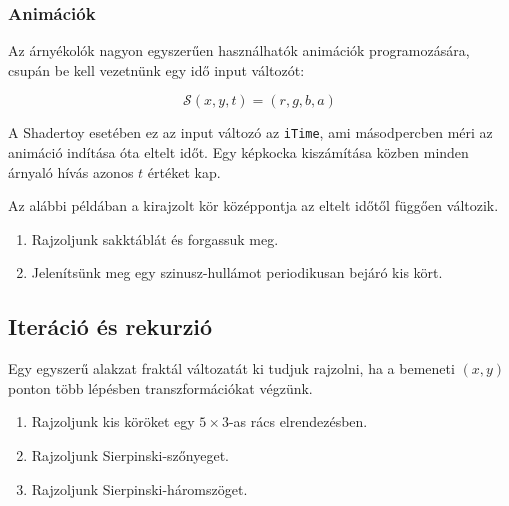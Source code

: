 \subsubsection{Animációk}
Az árnyékolók nagyon egyszerűen használhatók animációk programozására, csupán
be kell vezetnünk egy idő input változót:

$$\mathcal{S}(x, y, t) = (r, g, b, a)$$

A Shadertoy esetében ez az input változó az \texttt{iTime}, ami másodpercben méri az animáció indítása
óta eltelt időt. Egy képkocka kiszámítása közben minden árnyaló hívás azonos $t$ értéket kap.

Az alábbi példában a kirajzolt kör középpontja
az eltelt időtől függően változik.


\progfeladatok

\begin{enumerate}[resume]
  \item Rajzoljunk sakktáblát és forgassuk meg.
  \item Jelenítsünk meg egy szinusz-hullámot periodikusan bejáró kis kört.
\end{enumerate}

\subsection{Iteráció és rekurzió}

Egy egyszerű alakzat fraktál változatát ki tudjuk rajzolni, ha a bemeneti $(x,y)$
ponton több lépésben transzformációkat végzünk.

\progfeladatok
\begin{enumerate}[resume]
  \item Rajzoljunk kis köröket egy $5\times 3$-as rács elrendezésben.
  \item Rajzoljunk Sierpinski-szőnyeget.
  \item Rajzoljunk Sierpinski-háromszöget.
\end{enumerate}

